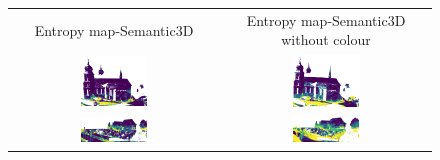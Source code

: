     \begin{figure}[h!]
        \centering
        \begin{tabular}{cc}
            Entropy map-Semantic3D & Entropy map-Semantic3D without colour \\
            \includegraphics[width=0.33\textwidth, height=0.18\textheight]{images/ood_imgs/de_sem3d/de_ent_10_1.pdf}&
            \includegraphics[width=0.33\textwidth, height=0.18\textheight]{images/sem3d_of/de_ent_sem3d_of_1.pdf}\\

            \includegraphics[width=0.33\textwidth, height=0.18\textheight]{images/ood_imgs/de_sem3d/de_ent_10_2.pdf}&
            \includegraphics[width=0.33\textwidth, height=0.18\textheight]{images/sem3d_of/de_ent_sem3d_of_2.pdf}\\


\end{tabular}
\end{figure}
